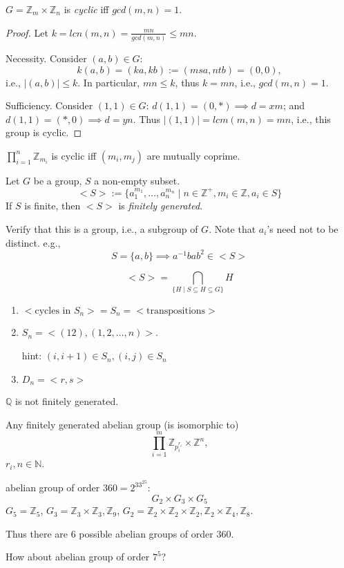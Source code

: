 \begin{theorem}
$G=\mathbb{Z}_m\times\mathbb{Z}_n$ is \emph{cyclic} iff $gcd(m,n)=1$.
\end{theorem}
\begin{proof}
Let $k=lcn(m,n)=\frac{mn}{gcd(m,n)}\le mn$.

Necessity. Consider $(a,b)\in G$:
\[
k(a,b)=(ka,kb):=(msa,ntb)=(0,0),
\]
i.e., $|(a,b)|\le k$. In particular, $mn\le k$, thus $k=mn$, i.e., $gcd(m,n)=1$.

Sufficiency. Consider $(1,1)\in G$: $d(1,1) = (0,*)\implies d=xm$; and $d(1,1)=(*,0)\implies d=yn$. Thus $|(1,1)| = lcm(m,n)=mn$, i.e., this group is cyclic.
\end{proof}
\begin{corollary}
$
\prod_{i=1}^n\mathbb{Z}_{m_i}
$ is cyclic iff $(m_i,m_j)$ are mutually coprime.
\end{corollary}
\begin{definition}
Let $G$ be a group, $S$ a non-empty subset.
\[
<S>:=\{a_1^{m_1},\dots,a_n^{m_n}\mid n\in\mathbb{Z}^+,m_i\in\mathbb{Z},a_i\in S\}
\]
If $S$ is finite, then $<S>$ is \emph{finitely generated}.
\end{definition}
Verify that this is a group, i.e., a subgroup of $G$. Note that $a_i$'s need not to be distinct. e.g.,
\[
S=\{a,b\}\implies a^{-1}bab^2\in<S>
\]
\begin{proposition}
\[
<S>=\bigcap_{\{H\mid S\subseteq H\subseteq G\}}H
\]
\end{proposition}
\begin{example}
\begin{enumerate}
\item
$<\mbox{cycles in $S_n$}> = S_n=<\mbox{transpositions}>$
\item
$S_n=<(12),(1,2,\dots,n)>$.

hint: $(i,i+1)\in S_n, (i,j)\in S_n$
\item
$D_n=<r,s>$
\end{enumerate}
\end{example}
\begin{proposition}
$\mathbb{Q}$ is not finitely generated.
\end{proposition}
\begin{theorem}
Any finitely generated abelian group (is isomorphic to)
\[
\prod_{i=1}^m\mathbb{Z}_{p_i^{r_i}}\times\mathbb{Z}^n,
\]
$r_i,n\in\mathbb{N}$.
\end{theorem}
\begin{example}
abelian group of order $360=2^33^25$:
\[
G_2\times G_3\times G_5
\]
$G_5=\mathbb{Z}_5$, $G_3=\mathbb{Z}_3\times \mathbb{Z}_3,\mathbb{Z}_9$, $G_2=\mathbb{Z}_2\times\mathbb{Z}_2\times\mathbb{Z}_2,\mathbb{Z}_2\times\mathbb{Z}_4,\mathbb{Z}_8$.

Thus there are 6 possible abelian groups of order $360$.
\end{example}
How about abelian group of order $7^5$?

